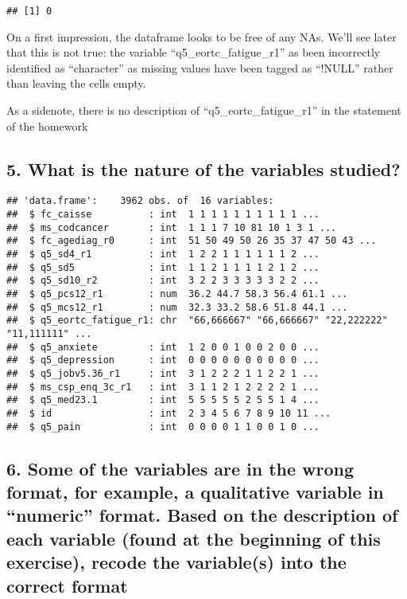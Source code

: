 \documentclass[
]{article}
\begin{document}
\begin{verbatim}
## [1] 0
\end{verbatim}

On a first impression, the dataframe looks to be free of any NAs. We'll
see later that this is not true: the variable ``q5\_eortc\_fatigue\_r1''
as been incorrectly identified as ``character'' as missing values have
been tagged as ``!NULL'' rather than leaving the cells empty.

As a sidenote, there is no description of ``q5\_eortc\_fatigue\_r1'' in
the statement of the homework

\hypertarget{what-is-the-nature-of-the-variables-studied}{%
\subsection{5. What is the nature of the variables
studied?}\label{what-is-the-nature-of-the-variables-studied}}

\begin{verbatim}
## 'data.frame':    3962 obs. of  16 variables:
##  $ fc_caisse          : int  1 1 1 1 1 1 1 1 1 1 ...
##  $ ms_codcancer       : int  1 1 1 7 10 81 10 1 3 1 ...
##  $ fc_agediag_r0      : int  51 50 49 50 26 35 37 47 50 43 ...
##  $ q5_sd4_r1          : int  1 2 2 1 1 1 1 1 1 2 ...
##  $ q5_sd5             : int  1 1 2 1 1 1 1 2 1 2 ...
##  $ q5_sd10_r2         : int  3 2 2 3 3 3 3 3 2 2 ...
##  $ q5_pcs12_r1        : num  36.2 44.7 58.3 56.4 61.1 ...
##  $ q5_mcs12_r1        : num  32.3 33.2 58.6 51.8 44.1 ...
##  $ q5_eortc_fatigue_r1: chr  "66,666667" "66,666667" "22,222222" "11,111111" ...
##  $ q5_anxiete         : int  1 2 0 0 1 0 0 2 0 0 ...
##  $ q5_depression      : int  0 0 0 0 0 0 0 0 0 0 ...
##  $ q5_jobv5.36_r1     : int  3 1 2 2 2 1 1 2 2 1 ...
##  $ ms_csp_enq_3c_r1   : int  3 1 1 2 1 2 2 2 2 1 ...
##  $ q5_med23.1         : int  5 5 5 5 5 2 5 5 1 4 ...
##  $ id                 : int  2 3 4 5 6 7 8 9 10 11 ...
##  $ q5_pain            : int  0 0 0 0 1 1 0 0 1 0 ...
\end{verbatim}

\hypertarget{some-of-the-variables-are-in-the-wrong-format-for-example-a-qualitative-variable-in-numeric-format.-based-on-the-description-of-each-variable-found-at-the-beginning-of-this-exercise-recode-the-variables-into-the-correct-format}{%
\subsection{6. Some of the variables are in the wrong format, for
example, a qualitative variable in ``numeric'' format. Based on the
description of each variable (found at the beginning of this exercise),
recode the variable(s) into the correct
format}\label{some-of-the-variables-are-in-the-wrong-format-for-example-a-qualitative-variable-in-numeric-format.-based-on-the-description-of-each-variable-found-at-the-beginning-of-this-exercise-recode-the-variables-into-the-correct-format}}
\end{document}

